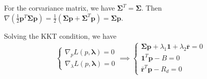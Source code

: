 \documentclass[12pt]{ftec2101}
\newcommand{\vect}[1]{\mathbf{#1}}
\begin{document}
For the corvariance matrix, we have $\boldsymbol{\Sigma}^T = \boldsymbol{\Sigma}$. Then $\nabla \left(\frac{1}{2}\vect{p}^T \boldsymbol{\Sigma} \vect{p}\right) = \frac{1}{2}(\boldsymbol{\Sigma}\vect{p}+\boldsymbol{\Sigma}^T \vect{p}) = \boldsymbol{\Sigma}\vect{p}$. 


Solving the KKT condition, we have
\begin{align}
    \begin{cases}
        \nabla_{p} L(p,\boldsymbol{\lambda}) = 0 \\
        \nabla_{\lambda} L(p,\boldsymbol{\lambda}) = 0
    \end{cases}
    \implies
    \begin{cases}
        \boldsymbol{\Sigma}\vect{p}+\lambda_1 \vect{1} + \lambda_2 \bar{\vect{r}} = 0 \\
        \vect{1}^T \vect{p} - B = 0 \\
        \bar{\vect{r}}^T \vect{p} - R_d = 0
    \end{cases}
    \label{KKT:1}
\end{align}
\end{document}
